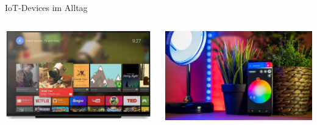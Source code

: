 \begin{frame}{IoT-Devices im Alltag}
    \begin{columns}
        \begin{column}[b]{.45\textwidth}
            \begin{center}
                \includegraphics[width=\textwidth]{img/android_tv}
            \end{center}
        \end{column}
        \begin{column}[b]{.45\textwidth}
            \begin{center}
                \includegraphics[width=\textwidth]{img/smart-home-3779361_1280}
            \end{center}
        \end{column}
    \end{columns}


\end{frame}
